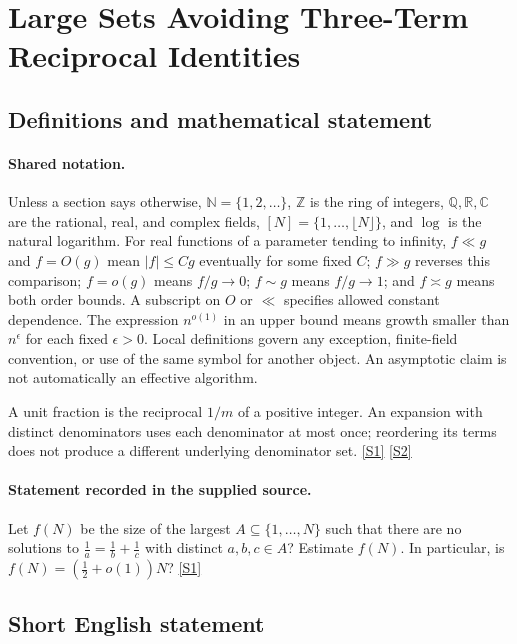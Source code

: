 \documentclass[11pt,a4paper]{article}
\newcommand{\N}{\mathbb{N}}
\newcommand{\Z}{\mathbb{Z}}
\newcommand{\Q}{\mathbb{Q}}
\newcommand{\R}{\mathbb{R}}
\newcommand{\C}{\mathbb{C}}
\newcommand{\sref}[2]{\hyperlink{source:#1:#2}{[S#2]}}
\begin{document}
\section{Large Sets Avoiding Three-Term Reciprocal Identities}\label{statement}


\subsection{Definitions and mathematical statement}

\paragraph{Shared notation.}Unless a section says otherwise, $\N=\{1,2,\ldots\}$,
$\Z$ is the ring of integers, $\Q,\R,\C$ are the rational, real, and complex
fields, $[N]=\{1,\ldots,\lfloor N\rfloor\}$, and $\log$ is the natural
logarithm. For real functions of a parameter tending to infinity,
$f\ll g$ and $f=O(g)$ mean $|f|\leq Cg$ eventually for some fixed $C$;
$f\gg g$ reverses this comparison; $f=o(g)$ means $f/g\to0$;
$f\sim g$ means $f/g\to1$; and $f\asymp g$ means both order bounds.
A subscript on $O$ or $\ll$ specifies allowed constant dependence.
The expression $n^{o(1)}$ in an upper bound means growth smaller than
$n^\epsilon$ for each fixed $\epsilon>0$. Local definitions govern any
exception, finite-field convention, or use of the same symbol for another
object. An asymptotic claim is not automatically an effective algorithm.



A unit fraction is the reciprocal $1/m$ of a positive integer. An expansion with distinct denominators uses each denominator at most once; reordering its terms does not produce a different underlying denominator set. \sref{statement}{1} \sref{statement}{2}

\paragraph{Statement recorded in the supplied source.}
Let $f(N)$ be the size of the largest $A\subseteq \{1,\ldots,N\}$ such that there are no solutions to $ \frac{1}{a}= \frac{1}{b}+\frac{1}{c} $ with distinct $a,b,c\in A$?
Estimate $f(N)$. In particular, is $f(N)=(\tfrac{1}{2}+o(1))N$? \sref{statement}{1}

\subsection{Short English statement}
\end{document}
